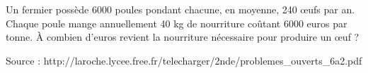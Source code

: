 
Un  fermier  possède  6000  poules  pondant  chacune,  en  moyenne,  240  œufs  par  an.  Chaque poule mange annuellement 40 kg de nourriture coûtant 6000 euros par tonne. À combien d’euros revient la nourriture nécessaire pour produire un œuf ? 

\hfill{{\scriptsize Source : http://laroche.lycee.free.fr/telecharger/2nde/problemes\_ouverts\_6a2.pdf}}